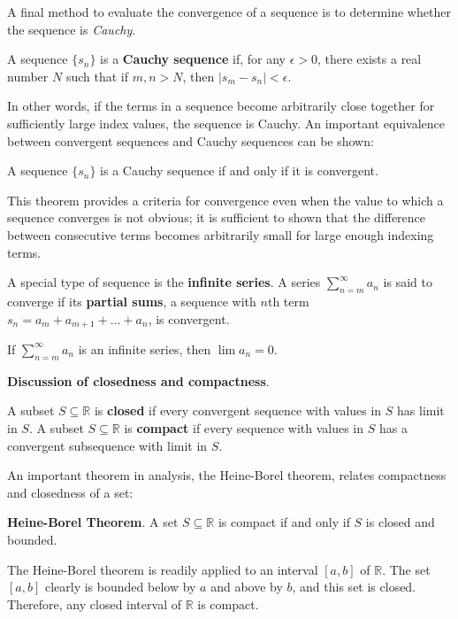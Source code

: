 A final method to evaluate the convergence of a sequence is to determine whether the sequence is \textit{Cauchy}.
\begin{defn}
    A sequence $\{s_n\}$ is a \textbf{Cauchy sequence} if, for any $\epsilon>0$, there exists a real number $N$ such that if $m,n>N$, then $|s_m - s_n| < \epsilon$.
\end{defn} In other words, if the terms in a sequence become arbitrarily close together for sufficiently large index values, the sequence is Cauchy. An important equivalence between convergent sequences and Cauchy sequences can be shown:
\begin{theorem*}
    A sequence $\{s_n\}$ is a Cauchy sequence if and only if it is convergent.
\end{theorem*} This theorem provides a criteria for convergence even when the value to which a sequence converges is not obvious; it is sufficient to shown that the difference between consecutive terms becomes arbitrarily small for large enough indexing terms.

A special type of sequence is the \textbf{infinite series}. A series $\sum_{n=m}^\infty a_n$ is said to converge if its \textbf{partial sums}, a sequence with $n$th term $s_n = a_m + a_{m+1} + \dots + a_n$, is convergent. \begin{theorem*}
    If $\sum_{n=m}^\infty a_n$ is an infinite series, then $\lim a_n=0$.
\end{theorem*}

\begin{shaded}
    \textbf{Discussion of closedness and compactness}. 
    
    \begin{defn}
        A subset $S\subseteq \mathbb{R}$ is \textbf{closed} if every convergent sequence with values in $S$ has limit in $S$. A subset $S\subseteq \mathbb{R}$ is \textbf{compact} if every sequence with values in $S$ has a convergent subsequence with limit in $S$.
    \end{defn}

    An important theorem in analysis, the Heine-Borel theorem, relates compactness and closedness of a set:

    \textbf{Heine-Borel Theorem}. A set $S\subseteq\mathbb{R}$ is compact if and only if $S$ is closed and bounded.

    The Heine-Borel theorem is readily applied to an interval $[a,b]$ of $\mathbb{R}$. The set $[a,b]$ clearly is bounded below by $a$ and above by $b$, and this set is closed. Therefore, any closed interval of $\mathbb{R}$ is compact.
\end{shaded}

